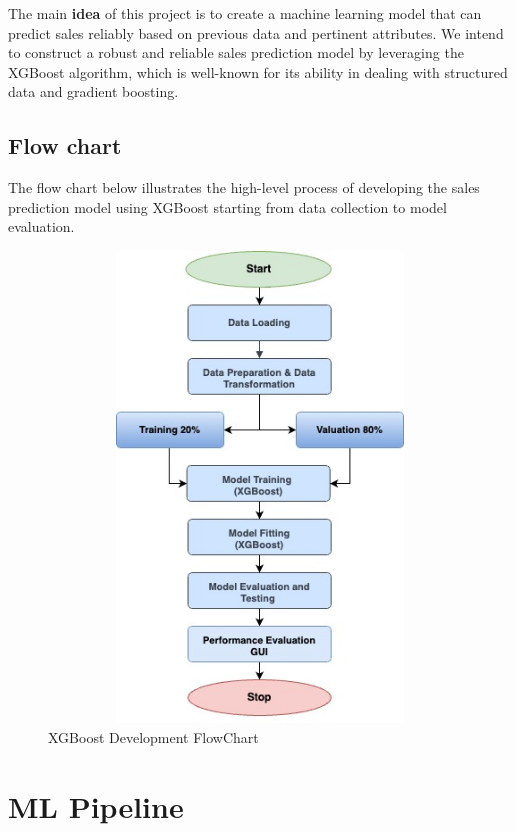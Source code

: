 	The main \textbf{idea} of this project is to create a machine learning model that can predict sales reliably based on previous data and pertinent attributes. We intend to construct a robust and reliable sales prediction model by leveraging the XGBoost algorithm, which is well-known for its ability in dealing with structured data and gradient boosting.
	
	\subsection{Flow chart}
	
	The flow chart below illustrates the high-level process of developing the sales prediction model using XGBoost starting from data collection to model evaluation.
	
	\begin{center}
		\begin{figure}[H]
			\begin{center}
				\includegraphics[height=125mm, width=130mm]{Images/DevelopmentFlowChart}
			\end{center}
			\caption{ XGBoost Development FlowChart}
		\end{figure}
	\end{center}

\section{ML Pipeline}
	
